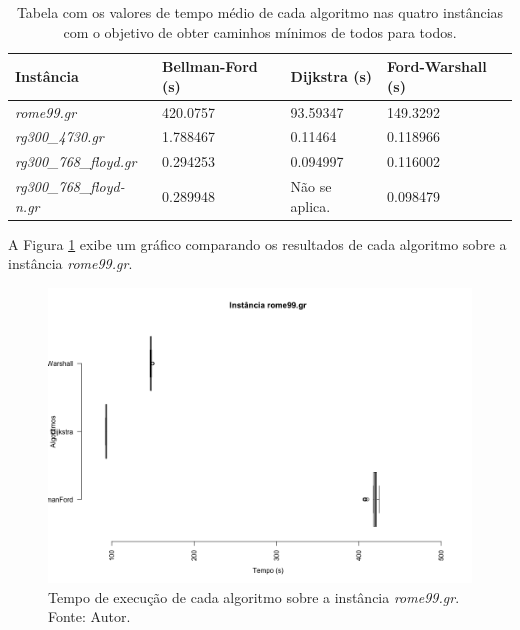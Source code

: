 \documentclass[12pt]{article}
\begin{document}
\begin{table}[H]
	\centering
	\caption{Tabela com os valores de tempo médio de cada algoritmo nas quatro instâncias com o objetivo de obter caminhos mínimos de todos para todos.}
    \begin{tabular}{l|lll}
    \hline
    \textbf{Instância} & \textbf{Bellman-Ford (s)} & \textbf{Dijkstra (s)} & \textbf{Ford-Warshall (s)} \\ \hline \hline
   \textit{ rome99.gr}         & 420.0757                           & 93.59347                          & 149.3292                            \\
   \textit{ rg300\_4730.gr}         & 1.788467                           & 0.11464                          & 0.118966                            \\
   \textit{ rg300\_768\_floyd.gr}         & 0.294253                           & 0.094997                          & 0.116002                            \\
   \textit{ rg300\_768\_floyd-n.gr}    & 0.289948  & Não se aplica.                              & 0.098479                            \\ \hline
    \end{tabular}
\end{table}


A Figura \ref{fig:rome} exibe um gráfico comparando os resultados de cada algoritmo sobre a instância \textit{rome99.gr}.

\begin{figure}[H]
  \centering
    \includegraphics[width=1\textwidth]{img/rome99.png}
  \caption{Tempo de execução de cada algoritmo sobre a instância \textit{rome99.gr}. Fonte: Autor.}
  \label{fig:rome}
\end{figure}
\end{document}
